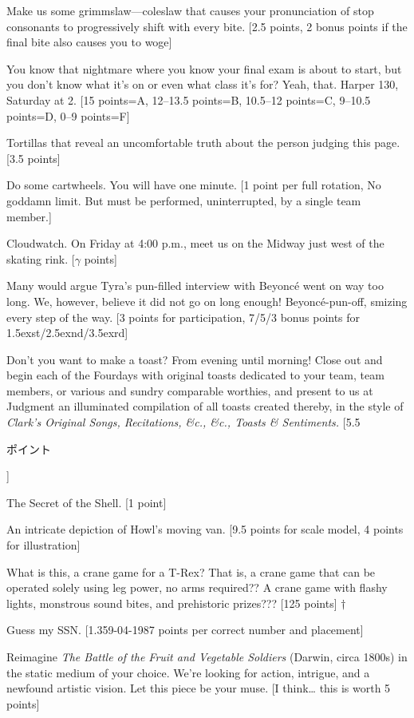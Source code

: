 \documentclass{book}
\def\nd{\raise.5ex\hbox{\scriptsize nd}}
\def\st{\raise.5ex\hbox{\scriptsize st}}
\def\rd{\raise.5ex\hbox{\scriptsize rd}}
\begin{document}
\begin{list}{}{}
\item Make us some grimmslaw—coleslaw that causes your pronunciation of stop consonants to progressively shift with every bite. [2.5 points, 2 bonus points if the final bite also causes you to woge]
\item You know that nightmare where you know your final exam is about to start, but you don’t know what it’s on or even what class it’s for? Yeah, that. Harper 130, Saturday at 2. [15 points=A, 12--13.5 points=B, 10.5--12 points=C, 9--10.5 points=D, 0--9 points=F]
\item Tortillas that reveal an uncomfortable truth about the person judging this page. [3.5 points]
\item Do some cartwheels. You will have one minute. [1 point per full rotation, No goddamn limit. But must be performed, uninterrupted, by a single team member.]
\item Cloudwatch. On Friday at 4:00 p.m., meet us on the Midway just west of the skating rink. [$\gamma$ points]
\item Many would argue Tyra’s pun-filled interview with Beyoncé went on way too long. We, however, believe it did not go on long enough! Beyoncé-pun-off, smizing every step of the way. [3 points for participation, 7/5/3 bonus points for 1\st/2\nd/3\rd]
\item Don’t you want to make a toast? From evening until morning! Close out and begin each of the Fourdays with original toasts dedicated to your team, team members, or various and sundry comparable worthies, and present to us at Judgment an illuminated compilation of all toasts created thereby, in the style of \textit{Clark’s Original Songs, Recitations, \&c., \&c., Toasts \& Sentiments.} [5.5 \begin{CJK}{UTF8}{min}ポイント\end{CJK}]
\item The Secret of the Shell. [1 point]
\newpage
\item An intricate depiction of Howl's moving van. [9.5 points for scale model, 4 points for illustration]
\item What is this, a crane game for a T-Rex? That is, a crane game that can be operated solely using leg power, no arms required?? A crane game with flashy lights, monstrous sound bites, and prehistoric prizes??? [125 points] $\dagger$
\item Guess my SSN. [1.359-04-1987 points per correct number and placement]
\item Reimagine \textit{The Battle of the Fruit and Vegetable Soldiers} (Darwin, circa 1800s) in the static medium of your choice. We're looking for action, intrigue, and a newfound artistic vision. Let this piece be your muse. [I think… this is worth 5 points]

\end{list}
\end{document}
